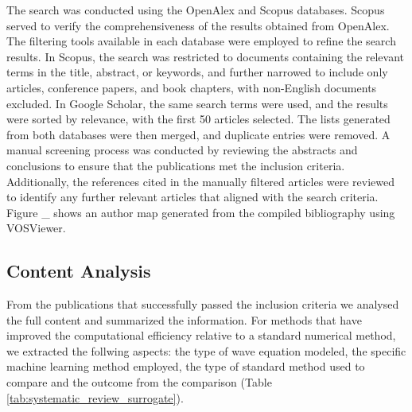 \documentclass[11pt,twoside]{article}
\begin{document}
\vspace*{2mm}

The search was conducted using the OpenAlex and Scopus databases. Scopus 
served to verify the comprehensiveness of the results obtained from OpenAlex. The filtering 
tools available in each database were employed 
to refine the search results. In Scopus, the search was restricted to documents containing 
the relevant terms in the title, abstract, or keywords, and further narrowed to include only 
articles, conference papers, and book chapters, with non-English documents excluded. In 
Google Scholar, the same search terms were used, and the results were sorted by relevance, 
with the first 50 articles selected. The lists generated from both databases were then merged, 
and duplicate entries were removed. A manual screening process was conducted by reviewing the 
abstracts and conclusions to ensure that the publications met the inclusion criteria. 
Additionally, the references cited in the manually filtered articles were reviewed to identify 
any further relevant articles that aligned with the search criteria. Figure \_ shows an author 
map generated from the compiled bibliography using VOSViewer. 

\subsection*{Content Analysis}

From the publications that successfully passed the inclusion criteria
we analysed the full content and summarized the information. For methods that have improved the 
computational efficiency relative to a standard numerical method, we extracted the follwing aspects: 
the type of wave equation modeled, the specific machine learning method employed, the type of standard method 
used to compare and the outcome from the comparison (Table \ref{tab:systematic_review_surrogate}).
\end{document}
